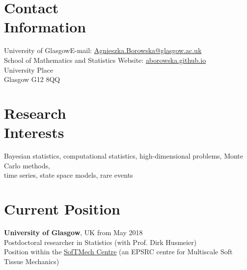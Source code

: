 \documentclass[margin,line]{resume}
\begin{document}
\begin{resume}
    \section{\mysidestyle Contact\\Information}
    University of Glasgow\hfill  E-mail: \url{Agnieszka.Borowska@glasgow.ac.uk} \\
    School of Mathematics and Statistics \hfill Website: \url{aborowska.github.io}\\ \vspace{0mm}%
    University Place \\
    Glasgow G12 8QQ\\ \vspace{-4.6mm}%
    \section{\mysidestyle Research\\Interests}
    
    Bayesian statistics, computational statistics, high-dimensional problems, Monte Carlo methods,\\
    time series, state space models, rare events
\vspace{-1mm}   
 
    \section{\mysidestyle Current Position}
    \textbf{University of Glasgow},  UK \hfill from May 2018\\
	Postdoctoral researcher in Statistics (with Prof. Dirk Husmeier)\\ 
    Position within the \href{http://softmech.org/}{SofTMech Centre} (an EPSRC centre for Multiscale Soft Tissue Mechanics)

\vspace{-1mm}    

\end{resume}
\end{document}

